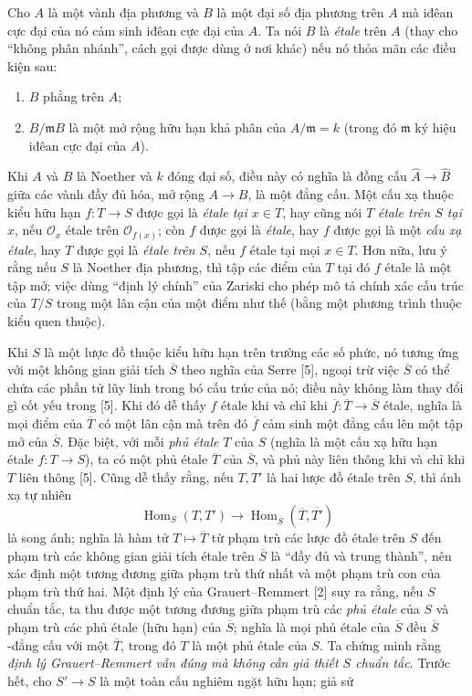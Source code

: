 \documentclass[11pt,twoside,openany]{book}
\numberwithin{equation}{section}
\begin{document}
Cho $A$ là một vành địa phương và $B$ là một đại số địa phương trên $A$ mà
iđêan cực đại của nó cảm sinh iđêan cực đại của $A$. Ta nói $B$ là
\emph{étale} trên $A$ (thay cho ``không phân nhánh'', cách gọi được dùng ở nơi
khác) nếu nó thỏa mãn các điều kiện sau:
\begin{enumerate}
\item[(i)] $B$ phẳng trên $A$;
\item[(ii)] $B/\mathfrak mB$ là một mở rộng hữu hạn khả phân của
$A/\mathfrak m=k$ (trong đó $\mathfrak m$ ký hiệu iđêan cực đại của $A$).
\end{enumerate}
Khi $A$ và $B$ là Noether và $k$ đóng đại số, điều này có nghĩa là đồng cấu
$\widehat A\longrightarrow\widehat B$ giữa các vành đầy đủ hóa, mở rộng
$A\longrightarrow B$, là một đẳng cấu. Một cấu xạ thuộc kiểu hữu hạn
$f:T\longrightarrow S$ được gọi là \emph{étale tại $x\in T$}, hay cũng nói
$T$ \emph{étale trên $S$ tại $x$}, nếu $\mathcal O_x$ étale trên
$\mathcal O_{f(x)}$; còn $f$ được gọi là \emph{étale}, hay $f$ được gọi là một
\emph{cấu xạ étale}, hay $T$ được gọi là \emph{étale trên $S$}, nếu $f$ étale tại mọi
$x\in T$. Hơn nữa, lưu ý rằng nếu $S$ là Noether địa phương, thì tập các điểm của
$T$ tại đó $f$ étale là một tập mở; việc dùng ``định lý chính'' của Zariski cho
phép mô tả chính xác cấu trúc của $T/S$ trong một lân cận của một điểm như thế
(bằng một phương trình thuộc kiểu quen thuộc).

Khi $S$ là một lược đồ thuộc kiểu hữu hạn trên trường các số phức, nó tương ứng
với một không gian giải tích $\overline S$ theo nghĩa của Serre [5], ngoại trừ
việc $\overline S$ có thể chứa các phần tử lũy linh trong bó cấu trúc của nó;
điều này không làm thay đổi gì cốt yếu trong [5]. Khi đó dễ thấy $f$ étale khi
và chỉ khi $\overline f:\overline T\longrightarrow\overline S$ étale, nghĩa là
mọi điểm của $\overline T$ có một lân cận mà trên đó $\overline f$ cảm sinh một
đẳng cấu lên một tập mở của $\overline S$. Đặc biệt, với mỗi \emph{phủ étale}
$T$ của $S$ (nghĩa là một cấu xạ hữu hạn étale $f:T\longrightarrow S$), ta có
một phủ étale $\overline T$ của $\overline S$, và phủ này liên thông khi và chỉ
khi $T$ liên thông [5]. Cũng dễ thấy rằng, nếu $T,T'$ là hai lược đồ
étale trên $S$, thì ánh xạ tự nhiên
\[
  \operatorname{Hom}_S(T,T')\longrightarrow
  \operatorname{Hom}_{\overline S}(\overline T,\overline{T'})
\]
là song ánh; nghĩa là hàm tử $T\longmapsto\overline T$ từ phạm trù các lược đồ
étale trên $S$ đến phạm trù các không gian giải tích étale trên $\overline S$
là ``đầy đủ và trung thành'', nên xác định một tương đương giữa phạm trù thứ
nhất và một phạm trù con của phạm trù thứ hai. Một định lý của
Grauert--Remmert [2] suy ra rằng, nếu $S$ chuẩn tắc, ta thu được một tương đương
giữa phạm trù các \emph{phủ étale} của $S$ và phạm trù các phủ étale (hữu hạn)
của $\overline S$; nghĩa là mọi phủ étale của $\overline S$ đều
$\overline S$-đẳng cấu với một $\overline T$, trong đó $T$ là một phủ étale của
$S$. Ta chứng minh rằng \emph{định lý Grauert--Remmert vẫn đúng mà không cần
giả thiết $S$ chuẩn tắc}. Trước hết, cho $S'\longrightarrow S$ là một toàn cấu
nghiêm ngặt hữu hạn; giả sử
\end{document}
